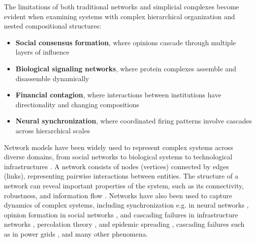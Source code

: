 The limitations of both traditional networks and simplicial complexes become evident when examining systems with complex hierarchical organization and nested compositional structures:

\begin{itemize}[leftmargin=*]
  \item \textbf{Social consensus formation}, where opinions cascade through multiple layers of influence \citep{watts1998collective}
  \item \textbf{Biological signaling networks}, where protein complexes assemble and disassemble dynamically \citep{strogatz2001exploring, giovannoni2017dynamic}
  \item \textbf{Financial contagion}, where interactions between institutions have directionality and changing compositions \citep{farmer2009economy}
  \item \textbf{Neural synchronization}, where coordinated firing patterns involve cascades across hierarchical scales \citep{bar2008dynamics, linde2021operad}
\end{itemize}

Network models have been widely used to represent complex systems across diverse domains, from social networks to biological systems to technological infrastructures \citep{boccaletti2006complex, newman2003structure}. A network consists of nodes (vertices) connected by edges (links), representing pairwise interactions between entities. The structure of a network can reveal important properties of the system, such as its connectivity, robustness, and information flow \citep{barabasi2004network}. Networks have also been used to capture dynamics of complex systems, including synchronization e.g. in neural networks \citep{arenas2008synchronization}, opinion formation in social networks \citep{castellano2009statistical}, and cascading failures in infrastructure networks \citep{watts2002simple}, percolation theory \citep{cohen2010complex}, and epidemic spreading \citep{pastor2015epidemic}, cascading failures such as in power grids \citep{dobson2007complex}, and many other phenomena.

